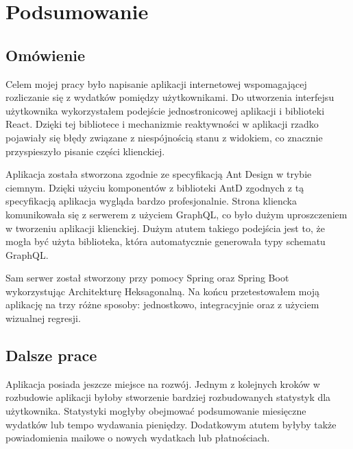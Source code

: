 \documentclass[
    left=2.5cm,         %
    right=2.5cm,        %
    top=2.5cm,          %
    bottom=3cm,         %
    bindingoffset=6mm,  %
    nohyphenation=false %
]{eiti/eiti-thesis}
\begin{document}


\clearpage %
\section{Podsumowanie}          %
\subsection{Omówienie}
Celem mojej pracy było napisanie aplikacji internetowej wspomagającej rozliczanie się z wydatków pomiędzy użytkownikami. Do utworzenia interfejsu użytkownika wykorzystałem podejście jednostronicowej aplikacji i biblioteki React. Dzięki tej bibliotece i mechanizmie reaktywności w aplikacji rzadko pojawiały się błędy związane z niespójnością stanu z widokiem, co znacznie przyspieszyło pisanie części klienckiej.

Aplikacja została stworzona zgodnie ze specyfikacją Ant Design w trybie ciemnym. Dzięki użyciu komponentów z biblioteki AntD zgodnych z tą specyfikacją aplikacja wygląda bardzo profesjonalnie. Strona kliencka komunikowała się z serwerem z użyciem GraphQL, co było dużym uproszczeniem w tworzeniu aplikacji klienckiej. Dużym atutem takiego podejścia jest to, że mogła być użyta biblioteka, która automatycznie generowała typy schematu GraphQL.

 Sam serwer został stworzony przy pomocy Spring oraz Spring Boot wykorzystując Architekturę Heksagonalną. Na końcu przetestowałem moją aplikację na trzy różne sposoby: jednostkowo, integracyjnie oraz z użyciem wizualnej regresji.
\subsection{Dalsze prace}

  Aplikacja posiada jeszcze miejsce na rozwój. Jednym z kolejnych kroków w rozbudowie aplikacji byłoby stworzenie bardziej rozbudowanych statystyk dla użytkownika. Statystyki mogłyby obejmować podsumowanie miesięczne wydatków lub tempo wydawania pieniędzy. Dodatkowym atutem byłyby także powiadomienia mailowe o nowych wydatkach lub płatnościach.
\end{document}
